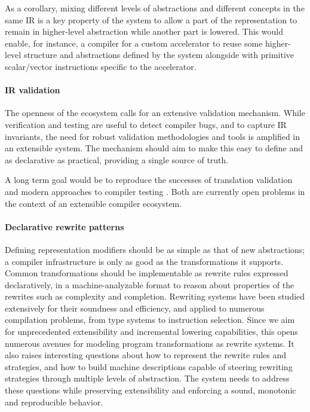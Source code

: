 As a corollary, mixing different levels of abstractions and different concepts in
the same IR is a key property of the system to allow a part of the
representation to remain in higher-level abstraction while another part is
lowered. This would enable, for instance, a compiler for a custom accelerator to reuse
some higher-level structure and abstractions defined by the system alongside
with primitive scalar/vector instructions specific to the accelerator.

\paragraph{IR validation}

The openness of the ecosystem calls for an extensive validation
mechanism. While verification and testing are useful to detect compiler bugs, and to capture IR
invariants, the need for robust validation methodologies and tools is amplified in an extensible system. The mechanism should aim to make this easy to define and as declarative
as practical, providing a single source of truth.

A long term goal would be to reproduce the successes of translation
validation
\cite{DBLP:conf/tacas/PnueliSS98,Necula:2000:TVO:358438.349314,DBLP:conf/popl/TristanL08,DBLP:conf/pldi/TristanL09}
and modern approaches to compiler testing
\cite{DBLP:conf/pldi/ChenGZWFER13}. Both are currently open problems in the context of an extensible
compiler ecosystem.

\paragraph{Declarative rewrite patterns}

Defining representation modifiers should be as simple as that of new
abstractions; a compiler infrastructure is only as good as the
transformations it supports. Common transformations should be implementable as
rewrite rules expressed declaratively, in a machine-analyzable format to reason
about properties of the rewrites such as complexity and completion. Rewriting systems have been studied extensively for their soundness and efficiency, and applied to numerous compilation problems, from type systems to instruction selection. Since we aim for unprecedented extensibility and incremental lowering capabilities, this opens numerous avenues for modeling program transformations as rewrite systems. It also raises interesting questions about how to represent the rewrite rules and strategies, and how to build machine descriptions capable of steering rewriting strategies through multiple levels of abstraction. The system needs to address these questions while preserving extensibility and enforcing a sound, monotonic and reproducible behavior.

